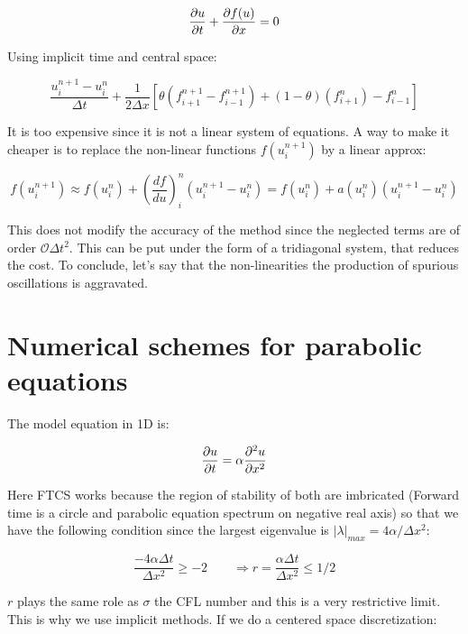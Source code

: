 \begin{equation}
\frac{\partial u}{\partial t }+ \frac{\partial f(u)}{\partial x} =0
\end{equation}

Using implicit time and central space: 

\begin{equation}
\frac{u^{n+1}_i-u_i^n}{\Delta t} + \frac{1}{2\Delta x} [\theta (f_{i+1}^{n+1}-f_{i-1}^{n+1})+(1-\theta) (f_{i+1}^n)-f^n_{i-1}]
\end{equation}

It is too expensive since it is not a linear system of equations. A way to make it cheaper is to replace the non-linear functions $f(u^{n+1}_i)$ by a linear approx:

\begin{equation}
f(u^{n+1}_i)\approx f(u^{n}_i)+ \left(\frac{d f}{du} \right)^n_i(u_i^{n+1}-u_i^{n}) = f(u_i^{n})+a (u_i^{n})(u_i^{n+1}-u_i^{n})
\end{equation}

This does not modify the accuracy of the method since the neglected terms are of order $\mathcal{O}\Delta t^2$. This can be put under the form of a tridiagonal system, that reduces the cost. To conclude, let's say that the non-linearities the production of spurious oscillations is aggravated. 

\section{Numerical schemes for parabolic equations}
The model equation in 1D is: 

\begin{equation}
\frac{\partial u}{\partial t} = \alpha \frac{\partial ^2 u}{\partial x^2}
\end{equation}

Here FTCS works because the region of stability of both are imbricated (Forward time is a circle and parabolic equation spectrum on negative real axis) so that we have the following condition since the largest eigenvalue is $|\lambda|_{max} = 4\alpha /\Delta x^2$: 

\begin{equation}
\frac{-4\alpha \Delta t}{\Delta x^2} \geq -2 \qquad \Rightarrow r= \frac{\alpha \Delta t}{\Delta x^2}\leq 1/2
\end{equation}

$r$ plays the same role as $\sigma$ the CFL number and this is a very restrictive limit. This is why we use implicit methods. If we do a centered space discretization: 

